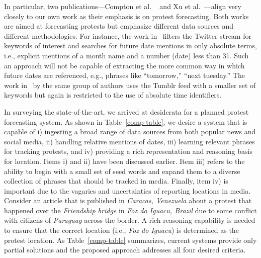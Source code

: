 In particular, two publications---Compton et al. ~\cite{compton2013detecting} and Xu et al.~\cite{xu2014civil}---align very closely to our own work as their emphasis is on protest forecasting.
Both works are aimed at forecasting protests
but emphasize different data sources and different methodologies. For instance, the work in~\cite{compton2013detecting} filters the Twitter stream for
keywords of interest and searches for future date mentions in only absolute terms, i.e., explicit mentions of a month name and a number (date)
less than 31. 
Such an approach will not be capable of extracting the more
common way in which future dates are referenced, e.g., phrases like
``tomorrow,'' ``next tuesday.'' 
The work in~\cite{xu2014civil} by the same group of authors uses the Tumblr feed with a smaller set of keywords but
again is restricted to the use of absolute time identifiers.

In surveying the state-of-the-art, we arrived at desiderata for a planned protest forecasting system. As shown in Table~\ref{comp-table},
we desire a system that is capable of i) ingesting a broad range of data sources from both popular news and social media,
ii) handling relative mentions of dates, iii) learning relevant phrases for tracking protests, and iv) providing a rich representation
and reasoning basis for location. Items i) and ii) have been discussed earlier. Item iii) refers to the ability to begin with
a small set of seed words and expand them to a diverse collection of phrases that should be tracked in media. Finally,
item iv) is important due to the vagaries and uncertainties of reporting locations in media. Consider an article that is published
in {\it Caracas, Venezuela} about a protest that happened over the {\it Friendship bridge} in {\it Foz do Iguacu, Brazil} due to 
some conflict with citizens of {\it Paraguay}
across the border. A rich reasoning capability is needed to ensure that the correct location (i.e., {\it Foz do Iguacu}) is determined 
as the protest location. As Table~\ref{comp-table} summarizes, current systems provide only partial solutions and the proposed
approach addresses all four desired criteria.
